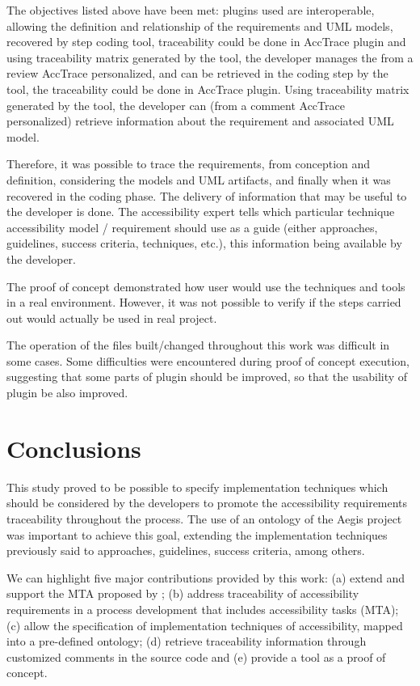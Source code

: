 \documentclass[10pt, conference, compsocconf]{IEEEtran}
\begin{document}
The objectives listed above have been met:
plugins used are interoperable, allowing the definition and relationship of the requirements and UML models, recovered by step coding tool, traceability could be done in AccTrace plugin and using traceability matrix generated by the tool, the developer manages the from a review AccTrace personalized, and can be retrieved in the coding step by the tool, the traceability could be done in AccTrace plugin. Using traceability matrix generated by the tool, the developer can (from a comment AccTrace personalized) retrieve information about the requirement and associated UML model.

Therefore, it was possible to trace the requirements, from conception and definition, considering the models and UML artifacts,
and finally when it was recovered in the coding phase. The delivery of information that may be useful to the developer is done.
The accessibility expert tells which particular technique accessibility
model / requirement should use as a guide (either approaches, guidelines, success criteria,
techniques, etc.), this information being available by the developer.

The proof of concept demonstrated how user would use the
techniques and tools in a real environment. However, it was not possible to verify
if the steps carried out would actually be used in real project.

The operation of the files built/changed throughout this work was
difficult in some cases. Some difficulties were encountered during proof of concept execution, 
suggesting that some parts of plugin should be improved, so that the usability of
plugin be also improved.



\section{Conclusions}

This study proved to be possible to specify implementation techniques which should
be considered by the developers to promote the accessibility requirements traceability throughout the process. 
The use of an ontology of the Aegis project \cite{aegis:13} was important to achieve this goal, extending the
implementation techniques previously said to approaches, guidelines, success criteria, among others.


We can highlight five major contributions provided by this
work: (a) extend and support the MTA proposed by \cite{maia:10}; (b) address traceability of accessibility requirements in a process
   development that includes accessibility tasks (MTA); (c) allow the specification of implementation techniques of accessibility,
   mapped into a pre-defined ontology; (d) retrieve traceability information through customized comments in the source code and (e) 
provide a tool as a proof of concept.
   
\end{document}

